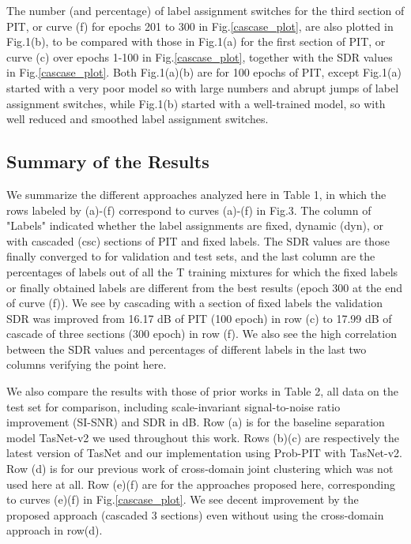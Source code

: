 \documentclass{article}
\begin{document}
The number (and percentage) of label assignment switches for the third section of PIT, or curve (f) for epochs 201 to 300 in Fig.\ref{cascase_plot}, are also plotted in Fig.1(b), to be compared with those in Fig.1(a) for the first section of PIT, or curve (c) over epochs 1-100 in Fig.\ref{cascase_plot}, together with the SDR values in Fig.\ref{cascase_plot}. Both Fig.1(a)(b) are for 100 epochs of PIT, except Fig.1(a) started with a very poor model so with large numbers and abrupt jumps of label assignment switches, while Fig.1(b) started with a well-trained model, so with well reduced and smoothed label assignment switches.

\subsection{Summary of the Results}

We summarize the different approaches analyzed here in Table 1, in which the rows labeled by (a)-(f) correspond to curves (a)-(f) in Fig.3. The column of "Labels" indicated whether the label assignments are fixed, dynamic (dyn), or with cascaded (csc) sections of PIT and fixed labels. The SDR values are those finally converged to for validation and test sets, and the last column are the percentages of labels out of all the T training mixtures for which the fixed labels or finally obtained labels are different from the best results (epoch 300 at the end of curve (f)). We see by cascading with a section of fixed labels the validation SDR was improved from 16.17 dB of PIT (100 epoch) in row (c) to 17.99 dB of cascade of three sections (300 epoch) in row (f). We also see the high correlation between the SDR values and percentages of different labels in the last two columns verifying the point here.

We also compare the results with those of prior works in Table 2, all data on the test set for comparison, including scale-invariant signal-to-noise ratio improvement (SI-SNR) \cite{luo2018speaker} and SDR in dB. Row (a) is for the baseline separation model TasNet-v2 \cite{luo2018tasnet} we used throughout this work. Rows (b)(c) are respectively the latest version of TasNet and our implementation using Prob-PIT\cite{Yousefi2019} with TasNet-v2. Row (d) is for our previous work of cross-domain joint clustering which was not used here at all. Row (e)(f) are for the approaches proposed here, corresponding to curves (e)(f) in Fig.\ref{cascase_plot}. We see decent improvement by the proposed approach (cascaded 3 sections) even without using the cross-domain approach in row(d).
\end{document}
